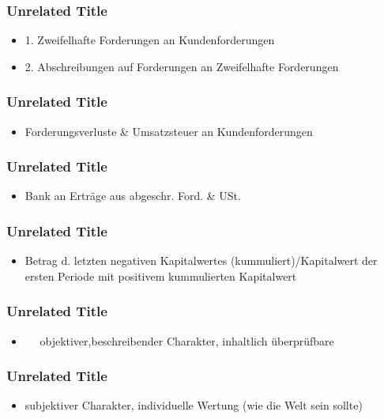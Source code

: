 \documentclass[aspectratio=3218]{beamer}
\begin{document}
\begin{frame}
\frametitle<presentation>{Unrelated Title}


\begin{itemize}
\item 1. Zweifelhafte Forderungen an Kundenforderungen
\item 2. Abschreibungen auf Forderungen an Zweifelhafte Forderungen
\end{itemize}

\note[item]{}
\end{frame}
\begin{frame}
\frametitle<presentation>{Unrelated Title}


\begin{itemize}
\item Forderungsverluste & Umsatzsteuer an Kundenforderungen
\end{itemize}

\note[item]{}
\end{frame}
\begin{frame}
\frametitle<presentation>{Unrelated Title}


\begin{itemize}
\item Bank an Erträge aus abgeschr. Ford. & USt.
\end{itemize}

\note[item]{}
\end{frame}
\begin{frame}
\frametitle<presentation>{Unrelated Title}


\begin{itemize}
\item Betrag d. letzten negativen Kapitalwertes (kummuliert)/Kapitalwert der ersten Periode mit positivem kummulierten Kapitalwert
\end{itemize}

\note[item]{}
\end{frame}
\begin{frame}
\frametitle<presentation>{Unrelated Title}


\begin{itemize}
\item    objektiver,beschreibender Charakter, inhaltlich überprüfbare
\end{itemize}

\note[item]{}
\end{frame}
\begin{frame}
\frametitle<presentation>{Unrelated Title}


\begin{itemize}
\item subjektiver Charakter, individuelle Wertung (wie die Welt sein sollte)
\end{itemize}

\note[item]{}
\end{frame}
\end{document}
